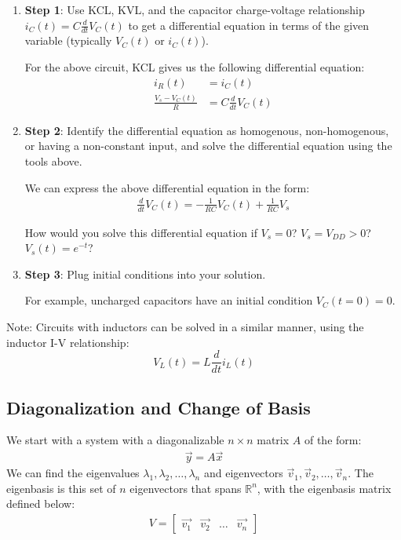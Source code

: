 \begin{enumerate}
    \item \textbf{Step 1}: Use KCL, KVL, and the capacitor charge-voltage relationship $i_C(t) = C \frac{d}{dt} V_C(t)$ to get a differential equation in terms of the given variable (typically $V_C(t)$ or $i_C(t)$).
    
    For the above circuit, KCL gives us the following differential equation:
    \begin{align*}
        i_R(t) &= i_C(t) \\
        \frac{V_s - V_C(t)}{R} &= C \frac{d}{dt} V_C(t)
    \end{align*}

    \item \textbf{Step 2}: Identify the differential equation as homogenous, non-homogenous, or having a non-constant input, and solve the differential equation using the tools above.

    We can express the above differential equation in the form:
    \begin{align*}
        \frac{d}{dt} V_C(t) = -\frac{1}{RC} V_C(t) + \frac{1}{RC} V_s
    \end{align*}

    How would you solve this differential equation if $V_s = 0$? $V_s = V_{DD} > 0$? $V_s(t) = e^{-t}$?

    \item \textbf{Step 3}: Plug initial conditions into your solution.

    For example, uncharged capacitors have an initial condition $V_C(t = 0) = 0$.
\end{enumerate}

Note: Circuits with inductors can be solved in a similar manner, using the inductor I-V relationship: 
$$\boxed{V_L(t) = L \frac{d}{dt} i_L(t)}$$

\subsection*{Diagonalization and Change of Basis}

We start with a system with a diagonalizable $n \times n$ matrix $A$ of the form:
\begin{align*}
    \vec{y} = A \vec{x}
\end{align*}
We can find the eigenvalues $\lambda_1, \lambda_2, \ldots, \lambda_n$ and eigenvectors $\vec{v}_1, \vec{v}_2, \ldots, \vec{v}_n$. The eigenbasis is this set of $n$ eigenvectors that spans $\mathbb{R}^n$, with the eigenbasis matrix defined below:
\begin{align*}
    V = \begin{bmatrix}
        \vec{v_1} & \vec{v_2} & \dots & \vec{v_n}
    \end{bmatrix}
\end{align*}

